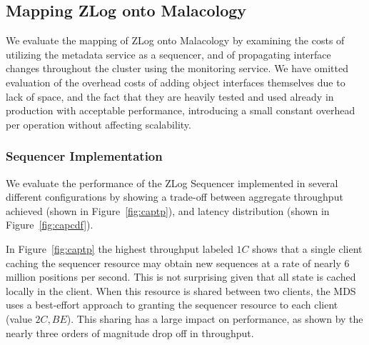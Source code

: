 \documentclass[preprint]{sigplanconf-eurosys}
\begin{document}
\subsection{Mapping ZLog onto Malacology}
\label{sec:mapping-zlog-onto-malacology}
We evaluate the mapping of ZLog onto Malacology by examining the costs of
utilizing the metadata service as a sequencer, and of propagating interface
changes throughout the cluster using the monitoring service. We have omitted
evaluation of the overhead costs of adding object interfaces themselves due to
lack of space, and the fact that they are heavily tested and used already in
production with acceptable performance, introducing a small constant overhead
per operation without affecting scalability.

\subsubsection{Sequencer Implementation}
\label{sec:sequencer-implementation}

We evaluate the performance of the ZLog Sequencer implemented in several
different configurations by showing a trade-off between aggregate throughput
achieved (shown in Figure~\ref{fig:captp}), and latency distribution (shown in
Figure~\ref{fig:capcdf}).

In Figure~\ref{fig:captp} the highest throughput labeled $1C$ shows that a
single client caching the sequencer resource may obtain new sequences at a rate
of nearly 6 million positions per second. This is not surprising given that all
state is cached locally in the client. When this resource is shared between two
clients, the MDS uses a best-effort approach to granting the sequencer resource
to each client (value $2C,BE$). This sharing has a large impact on performance,
as shown by the nearly three orders of magnitude drop off in throughput.
\end{document}
